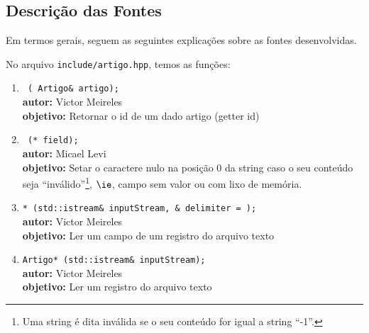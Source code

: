 \subsection{Descrição das Fontes}\label{subsec:descricao_das_fontes}

Em termos gerais, seguem as seguintes explicações sobre as fontes desenvolvidas.

No arquivo \texttt{include/artigo.hpp}, temos as funções:
\begin{enumerate} %
\setlength\itemsep{1em}

\item \texttt{ ( Artigo\& artigo);}\\
    \noindent \textbf{autor:} Victor Meireles \\
    \noindent \textbf{objetivo:} Retornar o id de um dado artigo (getter id)


\item \texttt{ (* field);} \\
    \noindent \textbf{autor:} Micael Levi \\
    \noindent \textbf{objetivo:} Setar o caractere nulo na posição $0$  da string caso o seu conteúdo seja ``inválido''\footnote{Uma string é dita inválida se o seu conteúdo for igual a string ``-1''.}, $\ie$, campo sem valor ou com lixo de memória.


\item \texttt{* (std::istream\& inputStream, \& delimiter = );} \\
    \noindent \textbf{autor:} Victor Meireles \\
    \noindent \textbf{objetivo:} Ler um campo de um registro do arquivo texto


\item \texttt{Artigo* (std::istream\& inputStream);} \\
    \noindent \textbf{autor:} Victor Meireles \\
    \noindent \textbf{objetivo:} Ler um registro do arquivo texto

\end{enumerate}

